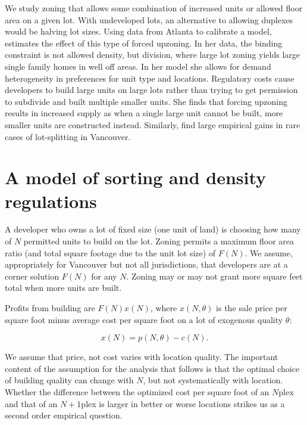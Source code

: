 \documentclass[12pt]{article}
\begin{document}
We study zoning that allows some combination of increased units or allowed floor area on a given lot. With undeveloped lots, an alternative to allowing duplexes would be halving lot sizes. Using data from Atlanta to calibrate a model, \textcite{Ma_2025} estimates the effect of this type of forced upzoning. In her data, the binding constraint is not allowed density, but division, where large lot zoning yields large single family homes in well off areas. In her model she allows for demand heterogeneity in preferences for unit type and locations. Regulatory costs cause developers to build large units on large lots rather than trying to get permission to subdivide and built multiple smaller units. She finds that forcing upzoning results in increased supply as when a single large unit cannot be built, more smaller units are constructed instead. Similarly, \textcite{vonBergmannLauster} find large empirical gains in rare cases of lot-splitting in Vancouver.


\section{\label{sec:model} A model of sorting and density regulations}

A developer who owns a lot of fixed size (one unit of land) is choosing how many of
$N$ permitted units to build on the lot. Zoning permits a maximum floor area
ratio (and total square footage due to the unit lot size) of $F(N)$. We assume,
appropriately for Vancouver but not all jurisdictions, that developers are at a
corner solution $F(N)$ for any $N$. Zoning may or may not grant more square
feet total when more units are built. 

Profits from building are $F(N)x(N)$, where $x(N,\theta)$ is
the sale price per square foot minus average cost per square foot on a lot of
exogenous quality $\theta$:

\begin{equation}
	x(N) = p(N,\theta) - c(N).
\end{equation}

We assume that price, not cost varies with location quality. The important
content of the assumption for the analysis that follows is that the optimal
choice of building quality can change with $N$, but not systematically with
location. Whether the difference between the optimized cost per square foot of
an $N$plex and that of an $N+1$plex is larger in better or worse locations
strikes us as a second order empirical question.
\end{document}
